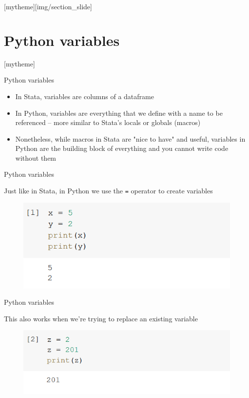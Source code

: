 \documentclass[aspectratio=169]{beamer}
\newcommand{\sectionpic}[2]{
	\setbeamertemplate{section page}[mytheme][#2]
	\section{#1}
	\setbeamertemplate{section page}[mytheme]
}
\begin{document}
\sectionpic{Python variables}{img/section_slide}

\begin{frame}{Python variables}

	\begin{itemize}
		\item In Stata, variables are columns of a dataframe
		\item In Python, variables are everything that we define with a name to be referenced -- more similar to Stata's locals or globals (macros)
		\item Nonetheless, while macros in Stata are "nice to have" and useful, variables in Python are the building block of everything and you cannot write code without them
	\end{itemize}

\end{frame}

\begin{frame}{Python variables}

	Just like in Stata, in Python we use the \texttt{=} operator to create variables

	\begin{figure}
		\centering
		\includegraphics[width=0.6\linewidth]{img/assignation.png}
	\end{figure}

\end{frame}

\begin{frame}{Python variables}

	This also works when we're trying to replace an existing variable

	\begin{figure}
		\centering
		\includegraphics[width=0.6\linewidth]{img/replace.png}
	\end{figure}

\end{frame}
\end{document}
